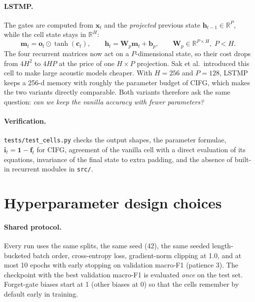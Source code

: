\documentclass[10pt,a4paper]{article}
\begin{document}
\paragraph{LSTMP.} The gates are computed from $\bm x_t$ and the \emph{projected} previous state
$\bm h_{t-1}\in\mathbb R^{P}$, while the cell state stays in $\mathbb R^{H}$:
\[
\bm m_t = \bm o_t\odot\tanh(\bm c_t), \qquad \bm h_t = \bm W_p\bm m_t + \bm b_p, \qquad \bm W_p\in\mathbb R^{P\times H},\; P<H .
\]
The four recurrent matrices now act on a $P$-dimensional state, so their cost drops from $4H^2$ to $4HP$ at the price
of one $H\times P$ projection. Sak et al.\ introduced this cell to make large acoustic models cheaper. With $H=256$ and
$P=128$, LSTMP keeps a 256-d memory with roughly the parameter budget of CIFG, which makes the two variants directly
comparable. Both variants therefore ask the same question: \emph{can we keep the vanilla accuracy with fewer
parameters?}

\begin{table}[h]
\centering\small
\ParamsTable
\caption{Trainable parameters ($D=128$, $H=256$). The recurrent counts follow $4H(D+H+1)$ (vanilla), $3H(D+H+1)$
(CIFG) and $4H(D+P+1)+PH+P$ (LSTMP); unit tests check these formulae. Totals include the \Vocab{}$\times$128
embedding, which dominates.}
\label{tab:params}
\end{table}

\paragraph{Verification.} \texttt{tests/test\_cells.py} checks the output shapes, the parameter formulae,
$\bm i_t=\bm 1-\bm f_t$ for CIFG, agreement of the vanilla cell with a direct evaluation of its equations, invariance
of the final state to extra padding, and the absence of built-in recurrent modules in \texttt{src/}.

\section{Hyperparameter design choices}
\paragraph{Shared protocol.} Every run uses the same splits, the same seed (42), the same seeded length-bucketed batch
order, cross-entropy loss, gradient-norm clipping at 1.0, and at most 10 epochs with early stopping on validation
macro-F1 (patience 3). The checkpoint with the best validation macro-F1 is evaluated \emph{once} on the test set.
Forget-gate biases start at 1 (other biases at 0) so that the cells remember by default early in training.
\end{document}
